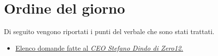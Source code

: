 \clearpage
\section{Ordine del giorno}
Di seguito vengono riportati i punti del verbale che sono stati trattati.
\begin{itemize}
	\item  \hyperref[sec:elenco]{Elenco domande fatte al \emph{CEO Stefano Dindo di Zero12}.}
\end{itemize}